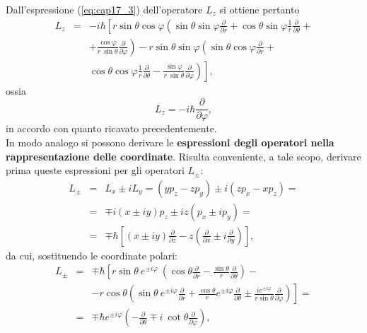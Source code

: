 Dall'espressione (\ref{eq:cap17_3}) dell'operatore $L_z$ si ottiene pertanto
\begin{eqnarray}
L_z &=&-i\hbar \left[ r\sin \theta \cos \varphi \left(\sin \theta \sin \varphi \frac{\partial}{\partial r}+\cos \theta \sin \varphi\frac{1}{r} \frac{\partial}{\partial \theta}+ \right.\right. \nonumber \\
& &\left. + \frac{\cos \varphi}{r\ \sin \theta} \frac{\partial}{\partial \varphi}\right) - r \sin \theta \sin \varphi \left( \sin \theta \cos \varphi \frac{\partial}{\partial r}+\right. \nonumber \\
& & \left. \left. \cos \theta \cos \varphi\frac{1}{r} \frac{\partial}{\partial \theta}-\frac{\sin \varphi}{r\ \sin \theta} \frac{\partial}{\partial \varphi}\right)\right] ,
\end{eqnarray}
ossia
\begin{equation}
L_z = -i\hbar \frac{\partial}{\partial \varphi},
\end{equation}
in accordo con quanto ricavato precedentemente.\\
In modo analogo si possono derivare le \textbf{espressioni degli operatori nella rappresentazione delle coordinate}. Risulta conveniente, a tale scopo, derivare prima queste espressioni per gli operatori $L_{\pm}$:
\begin{eqnarray}
L_{\pm} &=& L_x \pm iL_y = (yp_z-zp_y) \pm i(zp_x-xp_z)= \nonumber \\
&=& \mp i (x\pm iy)p_z \pm iz(p_x\pm ip_y)= \nonumber \\
&=&\mp \hbar \left[ \left(x\pm i y\right) \frac{\partial}{\partial z}- z \left( \frac{\partial}{\partial x}\pm i\frac{\partial}{\partial y}\right) \right] ,
\end{eqnarray}
da cui, sostituendo le coordinate polari:
\begin{eqnarray}
L_{\pm} &=&\mp \hbar \left[ r\sin \theta\ e^{\pm i \varphi}\ \left( \cos \theta\frac{\partial}{\partial r} -\frac{\sin \theta}{r}\frac{\partial}{\partial \theta} \right)- \right. \nonumber \\
& &\left. - r\cos \theta \left( \sin \theta\ e^{\pm i \varphi}\frac{\partial}{\partial r}+\frac{\cos \theta}{r} e^{\pm i \varphi}\frac{\partial}{\partial \theta}\pm\frac{i e^{\pm i \varphi}}{r\sin \theta}\frac{\partial}{\partial \varphi} \right)\right]= \nonumber \\
&=& \mp \hbar e^{\pm i \varphi}\left(-\frac{\partial}{\partial \theta}\mp i\ \cot \theta\frac{\partial}{\partial \varphi}\right) ,
\end{eqnarray}
